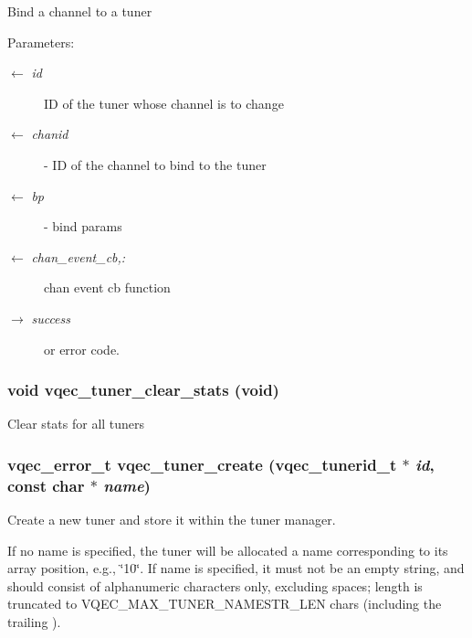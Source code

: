 Bind a channel to a tuner \begin{Desc}
\item[Parameters:]
\begin{description}
\item[\mbox{$\leftarrow$} {\em id}]ID of the tuner whose channel is to change \item[\mbox{$\leftarrow$} {\em chanid}]- ID of the channel to bind to the tuner \item[\mbox{$\leftarrow$} {\em bp}]- bind params \item[\mbox{$\leftarrow$} {\em chan\_\-event\_\-cb,:}]chan event cb function \item[\mbox{$\rightarrow$} {\em success}]or error code. \end{description}
\end{Desc}
\subsubsection{\setlength{\rightskip}{0pt plus 5cm}void vqec\_\-tuner\_\-clear\_\-stats (void)}\label{vqec__tuner_8c_2ee0b2887cba3dcc233f2d859590ee1d}


Clear stats for all tuners 
\subsubsection{\setlength{\rightskip}{0pt plus 5cm}vqec\_\-error\_\-t vqec\_\-tuner\_\-create (vqec\_\-tunerid\_\-t $\ast$ {\em id}, const char $\ast$ {\em name})}\label{vqec__tuner_8c_e826b805a1696cdecdc3b6be833b360a}


Create a new tuner and store it within the tuner manager.

If no name is specified, the tuner will be allocated a name corresponding to its array position, e.g., \char`\"{}10\char`\"{}. If name is specified, it must not be an empty string, and should consist of alphanumeric characters only, excluding spaces; length is truncated to VQEC\_\-MAX\_\-TUNER\_\-NAMESTR\_\-LEN chars (including the trailing ).

